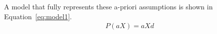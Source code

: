 A model that fully represents these a-priori assumptions is shown in Equation~\ref{eq:model1}.
\begin{align}
    P(aX) = aXd
\end{align}
